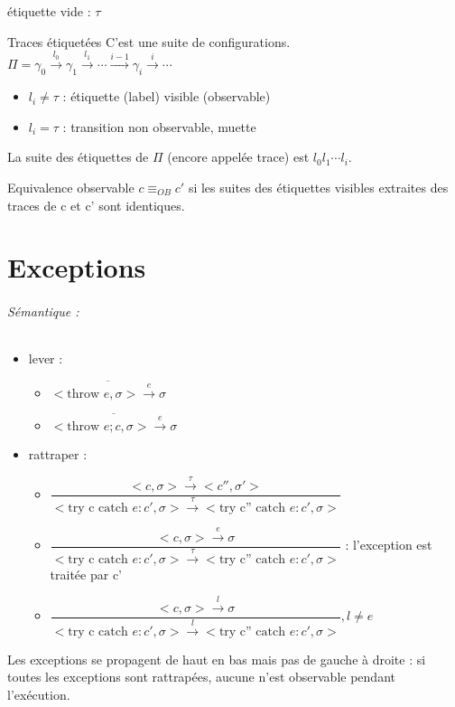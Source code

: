 \documentclass[10pt,a4paper]{article}
\begin{document}
étiquette vide : $\tau$

\begin{definition}{Traces étiquetées}
C'est une suite de configurations.\\
$\Pi = \gamma_0 \xrightarrow{l_0} \gamma_1 \xrightarrow{l_1} \cdots \xrightarrow{i-1} \gamma_i \xrightarrow{i} \cdots$\\
\begin{itemize}
\item $l_i \not = \tau $ : étiquette (label) visible (observable)
\item $l_i = \tau$ : transition non observable, muette
\end{itemize}
La suite des étiquettes de $\Pi$ (encore appelée trace) est $l_0l_1\cdots l_i$.\\
\end{definition}

\begin{definition}{Equivalence observable}
$c \equiv_{OB} c'$ si les suites des étiquettes visibles extraites des traces de c et c' sont identiques.\\
\end{definition}

\part{Exceptions}

\paragraph*{Sémantique : }
\begin{itemize}
\item lever : \begin{itemize}
\item $\overline{<\text{throw }e, \sigma> \xrightarrow{e} \sigma}$
\item $\overline{<\text{throw }e ;c , \sigma> \xrightarrow{e} \sigma}$
\end{itemize}
\item rattraper : \begin{itemize}
\item $\dfrac{< c, \sigma > \xrightarrow{\tau} < c'', \sigma' >}{<\text{try c catch }e:c', \sigma > \xrightarrow{\tau} <\text{try c'' catch }e:c', \sigma > }$
\item  $\dfrac{< c, \sigma > \xrightarrow{e} \sigma}{<\text{try c catch }e:c', \sigma > \xrightarrow{\tau} <\text{try c'' catch }e:c', \sigma > }$ : l'exception est traitée par c'
\item  $\dfrac{< c, \sigma > \xrightarrow{l} \sigma}{<\text{try c catch }e:c', \sigma > \xrightarrow{l} <\text{try c'' catch }e:c', \sigma > }, l \not = e$
\end{itemize}
\end{itemize}
\begin{rem}{} Les exceptions se propagent de  haut en bas mais pas de gauche à droite :  si toutes les exceptions sont rattrapées, aucune n'est observable pendant l'exécution.\\
\end{rem}
\end{document}
